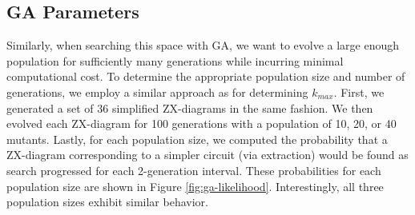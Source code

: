 \subsection*{GA Parameters}

Similarly, when searching this space with GA, we want to evolve a large enough population for sufficiently many generations while incurring minimal computational cost.
To determine the appropriate population size and number of generations, we employ a similar approach as for determining $k_{max}$.
First, we generated a set of 36 simplified ZX-diagrams in the same fashion.
We then evolved each ZX-diagram for 100 generations with a population of 10, 20, or 40 mutants.
Lastly, for each population size, we computed the probability that a ZX-diagram corresponding to a simpler circuit (via extraction) would be found as search progressed for each 2-generation interval.
These probabilities for each population size are shown in Figure \ref{fig:ga-likelihood}.
Interestingly, all three population sizes exhibit similar behavior.

